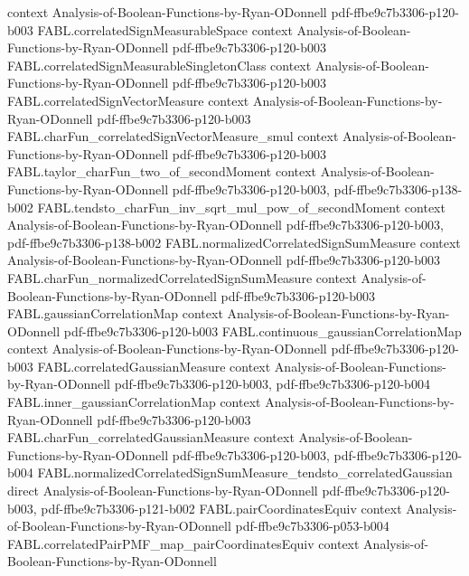 \begin{theorem}
  {context}
  {Analysis-of-Boolean-Functions-by-Ryan-ODonnell}
  {pdf-ffbe9c7b3306-p120-b003}
\proofstep
  {FABL.correlatedSignMeasurableSpace}
  {context}
  {Analysis-of-Boolean-Functions-by-Ryan-ODonnell}
  {pdf-ffbe9c7b3306-p120-b003}
\proofstep
  {FABL.correlatedSignMeasurableSingletonClass}
  {context}
  {Analysis-of-Boolean-Functions-by-Ryan-ODonnell}
  {pdf-ffbe9c7b3306-p120-b003}
\proofstep
  {FABL.correlatedSignVectorMeasure}
  {context}
  {Analysis-of-Boolean-Functions-by-Ryan-ODonnell}
  {pdf-ffbe9c7b3306-p120-b003}
\proofstep
  {FABL.charFun_correlatedSignVectorMeasure_smul}
  {context}
  {Analysis-of-Boolean-Functions-by-Ryan-ODonnell}
  {pdf-ffbe9c7b3306-p120-b003}
\proofstep
  {FABL.taylor_charFun_two_of_secondMoment}
  {context}
  {Analysis-of-Boolean-Functions-by-Ryan-ODonnell}
  {pdf-ffbe9c7b3306-p120-b003,
    pdf-ffbe9c7b3306-p138-b002}
\proofstep
  {FABL.tendsto_charFun_inv_sqrt_mul_pow_of_secondMoment}
  {context}
  {Analysis-of-Boolean-Functions-by-Ryan-ODonnell}
  {pdf-ffbe9c7b3306-p120-b003,
    pdf-ffbe9c7b3306-p138-b002}
\proofstep
  {FABL.normalizedCorrelatedSignSumMeasure}
  {context}
  {Analysis-of-Boolean-Functions-by-Ryan-ODonnell}
  {pdf-ffbe9c7b3306-p120-b003}
\proofstep
  {FABL.charFun_normalizedCorrelatedSignSumMeasure}
  {context}
  {Analysis-of-Boolean-Functions-by-Ryan-ODonnell}
  {pdf-ffbe9c7b3306-p120-b003}
\proofstep
  {FABL.gaussianCorrelationMap}
  {context}
  {Analysis-of-Boolean-Functions-by-Ryan-ODonnell}
  {pdf-ffbe9c7b3306-p120-b003}
\proofstep
  {FABL.continuous_gaussianCorrelationMap}
  {context}
  {Analysis-of-Boolean-Functions-by-Ryan-ODonnell}
  {pdf-ffbe9c7b3306-p120-b003}
\proofstep
  {FABL.correlatedGaussianMeasure}
  {context}
  {Analysis-of-Boolean-Functions-by-Ryan-ODonnell}
  {pdf-ffbe9c7b3306-p120-b003,
    pdf-ffbe9c7b3306-p120-b004}
\proofstep
  {FABL.inner_gaussianCorrelationMap}
  {context}
  {Analysis-of-Boolean-Functions-by-Ryan-ODonnell}
  {pdf-ffbe9c7b3306-p120-b003}
\proofstep
  {FABL.charFun_correlatedGaussianMeasure}
  {context}
  {Analysis-of-Boolean-Functions-by-Ryan-ODonnell}
  {pdf-ffbe9c7b3306-p120-b003,
    pdf-ffbe9c7b3306-p120-b004}
\proofstep
  {FABL.normalizedCorrelatedSignSumMeasure_tendsto_correlatedGaussian}
  {direct}
  {Analysis-of-Boolean-Functions-by-Ryan-ODonnell}
  {pdf-ffbe9c7b3306-p120-b003,
    pdf-ffbe9c7b3306-p121-b002}
\proofstep
  {FABL.pairCoordinatesEquiv}
  {context}
  {Analysis-of-Boolean-Functions-by-Ryan-ODonnell}
  {pdf-ffbe9c7b3306-p053-b004}
\proofstep
  {FABL.correlatedPairPMF_map_pairCoordinatesEquiv}
  {context}
  {Analysis-of-Boolean-Functions-by-Ryan-ODonnell}

\end{theorem}
